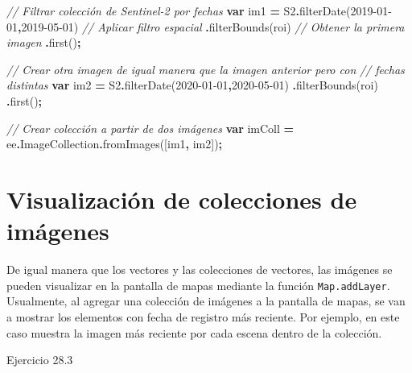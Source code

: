 \documentclass[
  12pt,
  letterpaper,
  twoside]{book}
\newenvironment{Shaded}{\begin{snugshade}}{\end{snugshade}}
\newcommand{\AttributeTok}[1]{\textcolor[rgb]{0.77,0.63,0.00}{#1}}
\newcommand{\CommentTok}[1]{\textcolor[rgb]{0.56,0.35,0.01}{\textit{#1}}}
\newcommand{\FunctionTok}[1]{\textcolor[rgb]{0.00,0.00,0.00}{#1}}
\newcommand{\KeywordTok}[1]{\textcolor[rgb]{0.13,0.29,0.53}{\textbf{#1}}}
\newcommand{\NormalTok}[1]{#1}
\newcommand{\OperatorTok}[1]{\textcolor[rgb]{0.81,0.36,0.00}{\textbf{#1}}}
\newcommand{\StringTok}[1]{\textcolor[rgb]{0.31,0.60,0.02}{#1}}
\begin{document}
\begin{Shaded}
\begin{Highlighting}[]
\CommentTok{// Filtrar colección de Sentinel{-}2 por fechas}
\KeywordTok{var}\NormalTok{ im1 }\OperatorTok{=}\NormalTok{ S2}\OperatorTok{.}\FunctionTok{filterDate}\NormalTok{(}\StringTok{\textquotesingle{}2019{-}01{-}01\textquotesingle{}}\OperatorTok{,}\StringTok{\textquotesingle{}2019{-}05{-}01\textquotesingle{}}\NormalTok{)}
  \CommentTok{// Aplicar filtro espacial}
 \OperatorTok{.}\FunctionTok{filterBounds}\NormalTok{(roi)}
 \CommentTok{// Obtener la primera imagen}
 \OperatorTok{.}\FunctionTok{first}\NormalTok{()}\OperatorTok{;}

\CommentTok{// Crear otra imagen de igual manera que la imagen anterior pero con }
\CommentTok{// fechas distintas}
\KeywordTok{var}\NormalTok{ im2 }\OperatorTok{=}\NormalTok{ S2}\OperatorTok{.}\FunctionTok{filterDate}\NormalTok{(}\StringTok{\textquotesingle{}2020{-}01{-}01\textquotesingle{}}\OperatorTok{,}\StringTok{\textquotesingle{}2020{-}05{-}01\textquotesingle{}}\NormalTok{)}
 \OperatorTok{.}\FunctionTok{filterBounds}\NormalTok{(roi)}
 \OperatorTok{.}\FunctionTok{first}\NormalTok{()}\OperatorTok{;}

\CommentTok{// Crear colección a partir de dos imágenes}
\KeywordTok{var}\NormalTok{ imColl }\OperatorTok{=}\NormalTok{ ee}\OperatorTok{.}\AttributeTok{ImageCollection}\OperatorTok{.}\FunctionTok{fromImages}\NormalTok{([im1}\OperatorTok{,}\NormalTok{ im2])}\OperatorTok{;}
\end{Highlighting}
\end{Shaded}

\hypertarget{visualizaciuxf3n-de-colecciones-de-imuxe1genes}{%
\section{Visualización de colecciones de imágenes}\label{visualizaciuxf3n-de-colecciones-de-imuxe1genes}}

De igual manera que los vectores y las colecciones de vectores, las imágenes se pueden visualizar en la pantalla de mapas mediante la función \texttt{Map.addLayer}. Usualmente, al agregar una colección de imágenes a la pantalla de mapas, se van a mostrar los elementos con fecha de registro más reciente. Por ejemplo, en este caso muestra la imagen más reciente por cada escena dentro de la colección.

Ejercicio 28.3
\end{document}

